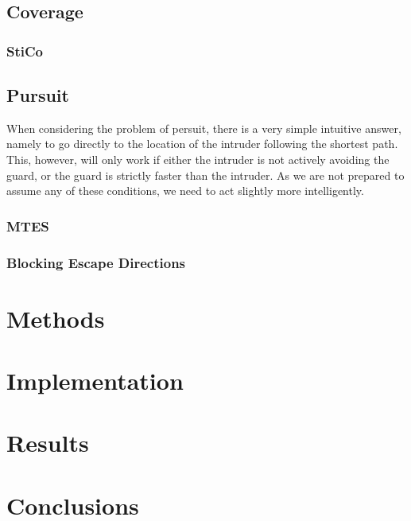 \documentclass{report}
\begin{document}
	\section{Coverage}
	
	\subsection{StiCo}
			

	\section{Pursuit}
		When considering the problem of persuit, there is a very simple intuitive answer, namely to go directly to the location of the intruder following the shortest path. This, however, will only work if either the intruder is not actively avoiding the guard, or the guard is strictly faster than the intruder. As we are not prepared to assume any of these conditions, we need to act slightly more intelligently.

		\subsection{MTES}
			

		\subsection{Blocking Escape Directions}
			

\chapter{Methods}

\chapter{Implementation}

\chapter{Results}


\chapter{Conclusions}
\end{document}
